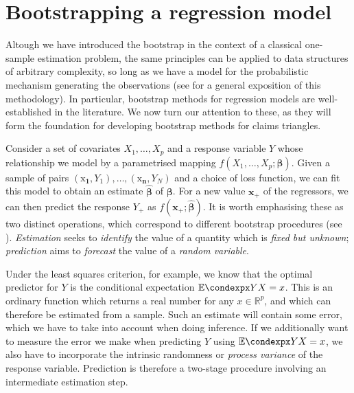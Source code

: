 \documentclass[a4paper]{book}
\begin{document}
\section{Bootstrapping a regression model} \label{sec:boot-reg}

Altough we have introduced the bootstrap in the context of a classical one-sample estimation problem, the same principles can be applied to data structures of arbitrary complexity, so long as we have a model for the probabilistic mechanism generating the observations (see \cite[Chapter 8]{efron:intro} for a general exposition of this methodology). In particular, bootstrap methods for regression models are well-established in the literature. We now turn our attention to these, as they will form the foundation for developing bootstrap methods for claims triangles.

Consider a set of covariates $X_1, \dots, X_p$ and a response variable $Y$ whose relationship we model by a parametrised mapping $f(X_1, \dots, X_p; \bm{\beta})$. Given a sample of pairs $(\bm{\mathrm{x}_1}, Y_1), \dots, (\bm{\mathrm{x}_n}, Y_N)$ and a choice of loss function, we can fit this model to obtain an estimate $\widehat{\bm{\beta}}$ of $\bm{\beta}$. For a new value $\mathbf{x_+}$ of the regressors, we can then predict the response $Y_+$ as $f(\mathbf{x_+}; \widehat{\bm{\beta}})$. It is worth emphasising these as two distinct operations, which correspond to different bootstrap procedures (see \cite[Sections 6.3.3 and 7.2.4]{davison}). \emph{Estimation} seeks to \emph{identify} the value of a quantity which is \emph{fixed but unknown}; \emph{prediction} aims to \emph{forecast} the value of a \emph{random variable}.

Under the least squares criterion, for example, we know that the optimal predictor for $Y$ is the conditional expectation $\condexp{Y}{X = x}$. This is an ordinary function which returns a real number for any $x \in \mathbb{R}^p$, and which can therefore be estimated from a sample. Such an estimate will contain some error, which we have to take into account when doing inference. If we additionally want to measure the error we make when predicting $Y$ using $\condexp{Y}{X = x}$, we also have to incorporate the intrinsic randomness or \emph{process variance} of the response variable. Prediction is therefore a two-stage procedure involving an intermediate estimation step.
\end{document}
